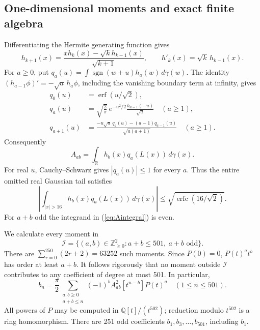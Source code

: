 \documentclass[11pt]{article}
\theoremstyle{definition}\newtheorem{definition}[theorem]{Definition}
\newcommand{\R}{\mathbb R}
\newcommand{\sgn}{\operatorname{sgn}}
\newcommand{\erf}{\operatorname{erf}}
\newcommand{\erfc}{\operatorname{erfc}}
\newcommand{\dd}{\,d}
\newcommand{\abs}[1]{\left\lvert#1\right\rvert}
\begin{document}
\subsection{One-dimensional moments and exact finite algebra}
Differentiating the Hermite generating function gives
\begin{equation}\label{eq:hermite-recurrence}
 h_{k+1}(x)=\frac{xh_k(x)-\sqrt{k}h_{k-1}(x)}{\sqrt{k+1}},
 \qquad h'_k(x)=\sqrt{k}\,h_{k-1}(x).
\end{equation}
For $a\geq0$, put $q_a(u)=\int\sgn(w+u)h_a(w)\dd\gamma(w)$.
The identity $(h_{a-1}\phi)'=-\sqrt a\,h_a\phi$, including the
vanishing boundary term at infinity, gives
\begin{align}
 q_0(u)&=\erf(u/\sqrt2),\nonumber\\
 q_a(u)&=\sqrt{\frac2\pi}\,e^{-u^2/2}
                      \frac{h_{a-1}(-u)}{\sqrt a}\quad(a\geq1),\label{eq:q}\\
 q_{a+1}(u)&=\frac{-u\sqrt a\,q_a(u)-(a-1)q_{a-1}(u)}{\sqrt{a(a+1)}}
                       \quad(a\geq1).\nonumber
\end{align}
Consequently
\begin{equation}\label{eq:Aintegral}
 A_{ab}=\int_\R h_b(x)q_a(L(x))\dd\gamma(x).
\end{equation}
For real $u$, Cauchy--Schwarz gives $|q_a(u)|\leq1$ for every $a$.
Thus the entire omitted real Gaussian tail satisfies
\begin{equation}\label{eq:moment-tail}
 \abs{\int_{|x|>16}h_b(x)q_a(L(x))\dd\gamma(x)}
 \leq\sqrt{\erfc(16/\sqrt2)}.
\end{equation}
For $a+b$ odd the integrand in (\ref{eq:Aintegral}) is even.

We calculate every moment in
\[
 \mathcal I=\{(a,b)\in\mathbb Z_{\geq0}^2:a+b\leq501,
                                      \ a+b\text{ odd}\}.
\]
There are $\sum_{r=0}^{250}(2r+2)=63252$ such moments. Since $P(0)=0$,
$P(t)^at^b$ has order at least $a+b$. It follows rigorously that no
moment outside $\mathcal I$ contributes to any coefficient of degree at
most 501. In particular,
\begin{equation}\label{eq:head-formula}
 b_n=\frac\pi2\sum_{\substack{a,b\geq0\\a+b\leq n}}
                (-1)^b A_{ab}^2[t^{n-b}]P(t)^a
       \quad(1\leq n\leq501).
\end{equation}
All powers of $P$ may be computed in $\mathbb Q[t]/(t^{502})$; reduction
modulo $t^{502}$ is a ring homomorphism. There are 251 odd coefficients
$b_1,b_3,\ldots,b_{501}$, including $b_1$.
\end{document}
